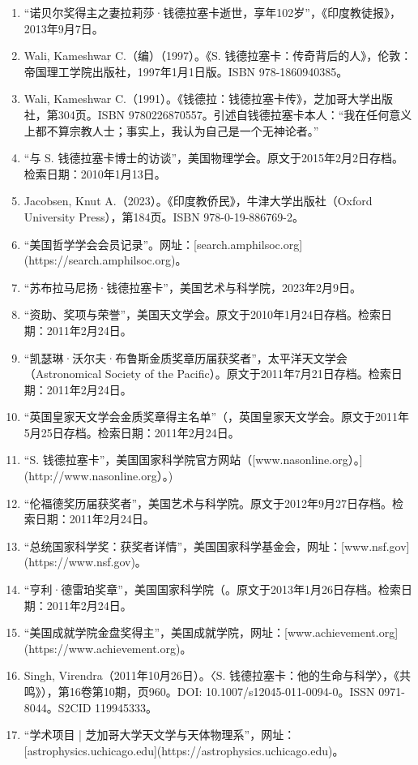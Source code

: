 \begin{enumerate}
\item “诺贝尔奖得主之妻拉莉莎·钱德拉塞卡逝世，享年102岁”，《印度教徒报》，2013年9月7日。
\item Wali, Kameshwar C.（编）（1997）。《S. 钱德拉塞卡：传奇背后的人》，伦敦：帝国理工学院出版社，1997年1月1日版。ISBN 978-1860940385。
\item Wali, Kameshwar C.（1991）。《钱德拉：钱德拉塞卡传》，芝加哥大学出版社，第304页。ISBN 9780226870557。引述自钱德拉塞卡本人：“我在任何意义上都不算宗教人士；事实上，我认为自己是一个无神论者。”
\item “与 S. 钱德拉塞卡博士的访谈”，美国物理学会。原文于2015年2月2日存档。检索日期：2010年1月13日。
\item Jacobsen, Knut A.（2023）。《印度教侨民》，牛津大学出版社（Oxford University Press），第184页。ISBN 978-0-19-886769-2。
\item “美国哲学学会会员记录”。网址：[search.amphilsoc.org](https://search.amphilsoc.org)。
\item “苏布拉马尼扬·钱德拉塞卡”，美国艺术与科学院，2023年2月9日。
\item “资助、奖项与荣誉”，美国天文学会。原文于2010年1月24日存档。检索日期：2011年2月24日。
\item “凯瑟琳·沃尔夫·布鲁斯金质奖章历届获奖者”，太平洋天文学会（Astronomical Society of the Pacific）。原文于2011年7月21日存档。检索日期：2011年2月24日。
\item “英国皇家天文学会金质奖章得主名单”（，英国皇家天文学会。原文于2011年5月25日存档。检索日期：2011年2月24日。
\item “S. 钱德拉塞卡”，美国国家科学院官方网站（[www.nasonline.org）。](http://www.nasonline.org）。)
\item “伦福德奖历届获奖者”，美国艺术与科学院。原文于2012年9月27日存档。检索日期：2011年2月24日。
\item “总统国家科学奖：获奖者详情”，美国国家科学基金会，网址：[www.nsf.gov](https://www.nsf.gov)。
\item “亨利·德雷珀奖章”，美国国家科学院（。原文于2013年1月26日存档。检索日期：2011年2月24日。
\item “美国成就学院金盘奖得主”，美国成就学院，网址：[www.achievement.org](https://www.achievement.org)。
\item Singh, Virendra（2011年10月26日）。〈S. 钱德拉塞卡：他的生命与科学〉，《共鸣》），第16卷第10期，页960。DOI: 10.1007/s12045-011-0094-0。ISSN 0971-8044。S2CID 119945333。
\item “学术项目 | 芝加哥大学天文学与天体物理系”，网址：[astrophysics.uchicago.edu](https://astrophysics.uchicago.edu)。

\end{enumerate}
